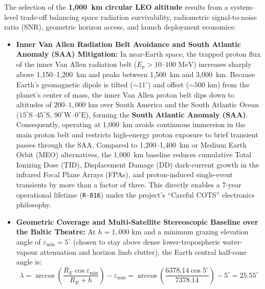 \documentclass[11pt,a4paper]{article}
\providecommand{\abbr}[1]{#1}
\begin{document}
The selection of the \textbf{1,000~km circular \abbr{LEO} altitude} results from a system-level trade-off balancing space radiation survivability, radiometric signal-to-noise ratio (\abbr{SNR}), geometric horizon access, and launch deployment economics:
\begin{itemize}
    \item \textbf{Inner Van Allen Radiation Belt Avoidance and South Atlantic Anomaly (\abbr{SAA}) Mitigation:} In near-Earth space, the trapped proton flux of the inner Van Allen radiation belt ($E_p > 10\text{--}100\text{ MeV}$) increases sharply above 1,150--1,200~km and peaks between 1,500~km and 3,000~km. Because Earth's geomagnetic dipole is tilted ($\sim 11^\circ$) and offset ($\sim 500\text{ km}$) from the planet's center of mass, the inner Van Allen proton belt dips down to altitudes of $200\text{--}1{,}000\text{ km}$ over South America and the South Atlantic Ocean ($15^\circ\text{S}\text{--}45^\circ\text{S}$, $90^\circ\text{W}\text{--}0^\circ\text{E}$), forming the \textbf{South Atlantic Anomaly (\abbr{SAA})}. Consequently, operating at 1,000~km avoids continuous immersion in the main proton belt and restricts high-energy proton exposure to brief transient passes through the \abbr{SAA}. Compared to 1,200--1,400~km or Medium Earth Orbit (\abbr{MEO}) alternatives, the 1,000~km baseline reduces cumulative Total Ionizing Dose (\abbr{TID}), Displacement Damage (\abbr{DD}) dark-current growth in the infrared Focal Plane Arrays (\abbr{FPA}s), and proton-induced single-event transients by more than a factor of three. This directly enables a 7-year operational lifetime (\texttt{R-016}) under the project's ``Careful \abbr{COTS}'' electronics philosophy.
    \item \textbf{Geometric Coverage and Multi-Satellite Stereoscopic Baseline over the Baltic Theatre:} At $h = 1{,}000\text{ km}$ and a minimum grazing elevation angle of $\varepsilon_{\min} = 5^\circ$ (chosen to stay above dense lower-tropospheric water-vapour attenuation and horizon limb clutter), the Earth central half-cone angle is:
    \[
        \lambda = \arccos\!\left(\frac{R_E \cos\varepsilon_{\min}}{R_E + h}\right) - \varepsilon_{\min} = \arccos\!\left(\frac{6378.14 \cos 5^\circ}{7378.14}\right) - 5^\circ = 25.55^\circ
    \]

\end{itemize}
\end{document}
